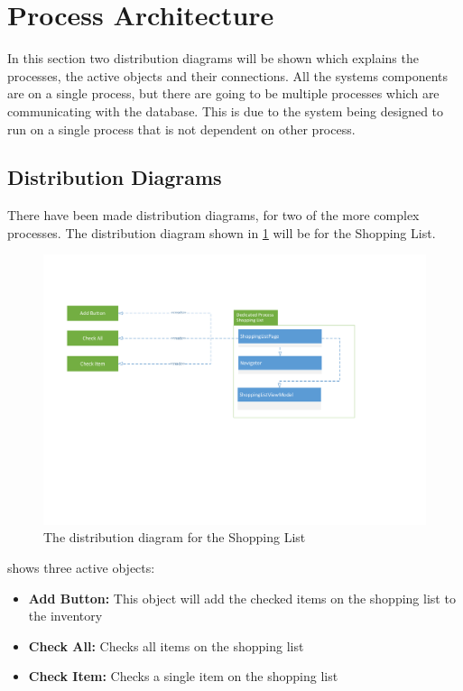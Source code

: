 \section{Process Architecture} \label{ProcessArchitecture}
In this section two distribution diagrams will be shown which explains the processes, the active objects and their connections. All the systems components are on a single process, but there are going to be multiple processes which are communicating with the database. This is due to the system being designed to run on a single process that is not dependent on other process.

\subsection{Distribution Diagrams}
There have been made distribution diagrams, for two of the more complex processes.
The distribution diagram shown in \cref{SLD} will be for the Shopping List.

\begin{figure}[H]
\includegraphics[width =\linewidth, clip=true, trim=1.5cm 8cm 5.5cm 3cm]{Grafik/FoodPlanner/DistributionShoppingList}
\centering
\caption{The distribution diagram for the Shopping List}
\label{SLD}
\end{figure}

 shows three active objects:
\begin{itemize}
\item \textbf{Add Button:} This object will add the checked items on the shopping list to the inventory
\item \textbf{Check All:} Checks all items on the shopping list 
\item \textbf{Check Item:} Checks a single item on the shopping list
\end{itemize}

